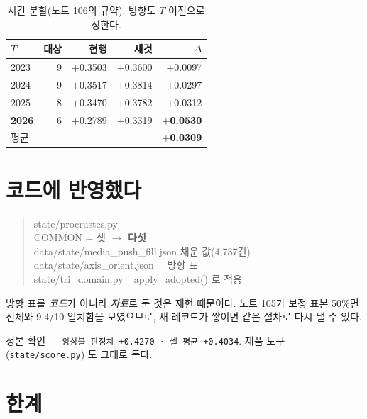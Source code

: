 \documentclass[10pt]{article}
\begin{document}
\begin{table}[t]
\centering\tsize
\caption{시간 분할(노트 106의 규약). 방향도 $T$ 이전으로 정한다.}
\begin{tabular}{lrrrr}
\toprule
$T$ & 대상 & 현행 & 새것 & $\Delta$ \\
\midrule
2023 & 9 & $+$0.3503 & $+$0.3600 & $+$0.0097 \\
2024 & 9 & $+$0.3517 & $+$0.3814 & $+$0.0297 \\
2025 & 8 & $+$0.3470 & $+$0.3782 & $+$0.0312 \\
\textbf{2026} & 6 & $+$0.2789 & $+$0.3319 & \textbf{$+$0.0530} \\
\midrule
\multicolumn{4}{l}{평균} & \textbf{$+$0.0309} \\
\bottomrule
\end{tabular}
\end{table}


\section{코드에 반영했다}

\begin{quote}\fontsize{9.0}{11}\selectfont\ttfamily
state/procrustes.py\\
\quad COMMON = 셋 $\to$ \textbf{다섯}\\[.3em]
data/state/media\_push\_fill.json \quad 채운 값(4,737건)\\
data/state/axis\_orient.json \quad\ \ 방향 표\\[.3em]
state/tri\_domain.py \quad \_apply\_adopted() 로 적용
\end{quote}

방향 표를 \emph{코드}가 아니라 \emph{자료}로 둔 것은 재현 때문이다. 노트 105가
보정 표본 50\%면 전체와 9.4/10 일치함을 보였으므로, 새 레코드가 쌓이면 같은
절차로 다시 낼 수 있다.

정본 확인 --- \texttt{앙상블 판정치 +0.4270 · 셀 평균 +0.4034}. 제품 도구
(\texttt{state/score.py}) 도 그대로 돈다.

\section{한계}
\end{document}
